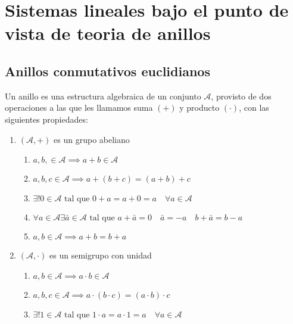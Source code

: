 \chapter{Sistemas  lineales bajo el punto de vista de teoria de anillos}

    \section{Anillos conmutativos euclidianos}

        Un anillo es una estructura algebraica de un conjunto $\mathcal{A}$, provisto de dos operaciones a las que les llamamos suma $(+)$ y producto $(\cdot)$, con las siguientes propiedades:

        \begin{enumerate}
            \item $(\mathcal{A}, +)$ es un grupo abeliano

            \begin{enumerate}
                \item $a, b, \in \mathcal{A} \implies a + b \in \mathcal{A}$
                \item $a, b, c \in \mathcal{A} \implies a + (b + c) = (a + b) + c$
                \item $\exists ! 0 \in \mathcal{A} \text{ tal que } 0 + a = a + 0 = a \quad \forall a \in \mathcal{A}$
                \item $\forall a \in \mathcal{A} \exists \bar{a} \in \mathcal{A} \text{ tal que } a + \bar{a} = 0 \quad \bar{a} = -a \quad b + \bar{a} = b - a$
                \item $a, b \in \mathcal{A} \implies a + b = b + a$
            \end{enumerate}

            \item $(\mathcal{A}, \cdot)$ es un semigrupo con unidad

            \begin{enumerate}
                \item $a, b \in \mathcal{A} \implies a \cdot b \in \mathcal{A}$
                \item $a, b, c \in \mathcal{A} \implies a \cdot (b \cdot c) = (a \cdot b) \cdot c$
                \item $\exists ! 1 \in \mathcal{A} \text{ tal que } 1 \cdot a  = a \cdot 1 = a \quad \forall a \in \mathcal{A}$
            \end{enumerate}


\end{enumerate}
